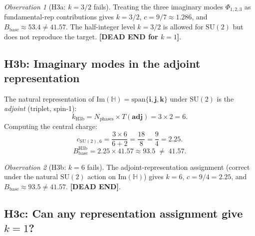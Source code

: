 \documentclass[11pt,a4paper]{article}
\theoremstyle{definition}
\theoremstyle{remark}
\newtheorem{observation}{Observation}
\begin{document}
\begin{observation}[H3a: $k = 3/2$ fails]
  \label{obs:H3_fund}
  Treating the three imaginary modes $\Phi_{1,2,3}$ as fundamental-rep
  contributions gives $k = 3/2$, $c = 9/7 \approx 1.286$, and
  $B_{\mathrm{base}} \approx 53.4 \neq 41.57$.
  The half-integer level $k = 3/2$ is allowed for $\mathrm{SU}(2)$
  but does not reproduce the target.
  \textbf{[DEAD END for $k=1$]}.
\end{observation}

\subsection{H3b: Imaginary modes in the adjoint representation}

The natural representation of $\mathrm{Im}(\mathbb{H}) = \mathrm{span}\{\mathbf{i},\mathbf{j},\mathbf{k}\}$
under $\mathrm{SU}(2)$ is the \emph{adjoint} (triplet, spin-1):
\begin{equation}
  k_{\mathrm{H3b}}
  = N_{\mathrm{phases}} \times T(\mathbf{adj})
  = 3 \times 2
  = 6.
  \label{eq:k_H3b}
\end{equation}
Computing the central charge:
\begin{equation}
  c_{\mathrm{SU}(2),6}
  = \frac{3 \times 6}{6 + 2}
  = \frac{18}{8}
  = \frac{9}{4}
  = 2.25.
  \label{eq:c_H3b}
\end{equation}
\begin{equation}
  B_{\mathrm{base}}^{\mathrm{H3b}}
  = 2.25 \times 41.57
  \approx 93.5
  \;\neq\; 41.57.
  \label{eq:B_H3b}
\end{equation}

\begin{observation}[H3b: $k = 6$ fails]
  \label{obs:H3_adj}
  The adjoint-representation assignment (correct under the natural
  $\mathrm{SU}(2)$ action on $\mathrm{Im}(\mathbb{H})$) gives
  $k = 6$, $c = 9/4 = 2.25$, and $B_{\mathrm{base}} \approx 93.5 \neq 41.57$.
  \textbf{[DEAD END]}.
\end{observation}

\subsection{H3c: Can any representation assignment give $k=1$?}
\end{document}

